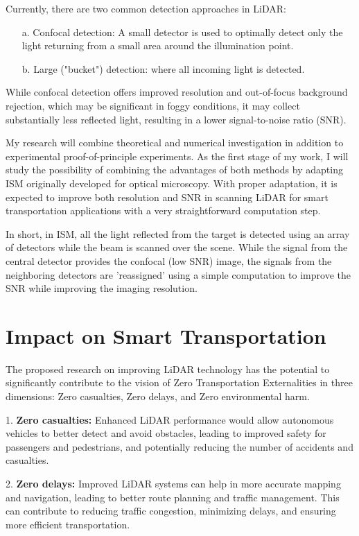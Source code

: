 \documentclass{article}
\begin{document}
Currently, there are two common detection approaches in LiDAR:
\begin{enumerate}
    \item[a.] Confocal detection: A small detector is used to optimally detect only the light returning from a small area around the illumination point.
\item[b.] Large ("bucket") detection: where all incoming light is detected.
\end{enumerate}

While confocal detection offers improved resolution and out-of-focus background rejection, which may be significant in foggy conditions, it may collect substantially less reflected light, resulting in a lower signal-to-noise ratio (SNR).

My research will combine theoretical and numerical investigation in addition to experimental proof-of-principle experiments. As the first stage of my work, I will study the possibility of combining the advantages of both methods by adapting ISM originally developed for optical microscopy. With proper adaptation, it is expected to improve both resolution and SNR in scanning LiDAR for smart transportation applications with a very straightforward computation step.

In short, in ISM, all the light reflected from the target is detected using an array of detectors while the beam is scanned over the scene. While the signal from the central detector provides the confocal (low SNR) image, the signals from the neighboring detectors are 'reassigned' using a simple computation to improve the SNR while improving the imaging resolution.

\vspace{-0.5em}
\section{Impact on Smart Transportation}
The proposed research on improving LiDAR technology has the potential to significantly contribute to the vision of Zero Transportation Externalities in three dimensions: Zero casualties, Zero delays, and Zero environmental harm.

1. \textbf{Zero casualties:} Enhanced LiDAR performance would allow autonomous vehicles to better detect and avoid obstacles, leading to improved safety for passengers and pedestrians, and potentially reducing the number of accidents and casualties.

2. \textbf{Zero delays:} Improved LiDAR systems can help in more accurate mapping and navigation, leading to better route planning and traffic management. This can contribute to reducing traffic congestion, minimizing delays, and ensuring more efficient transportation.
\end{document}
